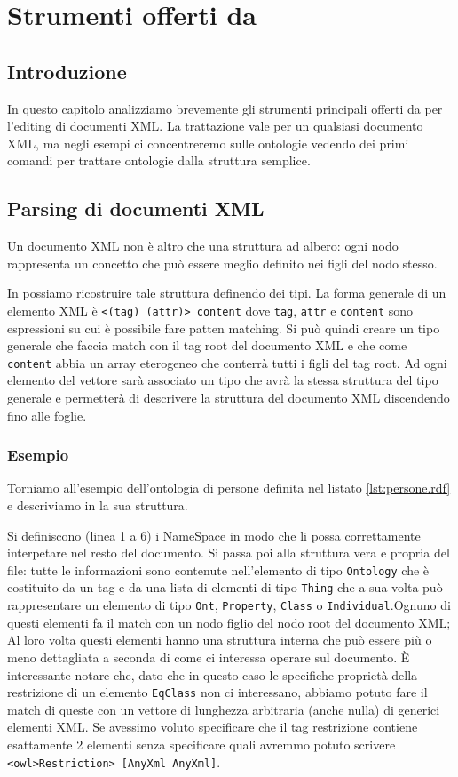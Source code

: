 \chapter{Strumenti offerti da \cduce}
\section*{Introduzione}
In questo capitolo analizziamo brevemente gli strumenti principali offerti da \cduce per l'editing di documenti XML. La trattazione vale per un qualsiasi documento XML, ma negli esempi ci concentreremo sulle ontologie vedendo dei primi comandi per trattare ontologie dalla struttura semplice. 


\section{Parsing di documenti XML}
Un documento XML non è altro che una struttura ad albero: ogni nodo rappresenta un concetto che può essere meglio definito nei figli del nodo stesso. 

In \cduce possiamo ricostruire tale struttura definendo dei tipi. La forma generale di un elemento XML è \verb|<(tag) (attr)> content| dove \verb|tag|, \verb|attr| e \verb|content| sono espressioni su cui è possibile fare patten matching. Si può quindi creare un tipo generale che faccia match con il tag root del documento XML e che come \verb|content| abbia un array eterogeneo che conterrà tutti i figli del tag root. Ad ogni elemento del vettore sarà associato un tipo che avrà la stessa struttura del tipo generale e permetterà di descrivere la struttura del documento XML discendendo fino alle foglie.
\subsection{Esempio}
Torniamo all'esempio dell'ontologia di persone definita nel listato \ref{lst:persone.rdf} e descriviamo in \cduce la sua struttura.

Si definiscono (linea 1 a 6) i NameSpace in modo che \cduce li possa correttamente interpetare nel resto del documento. Si passa poi alla struttura vera e propria del file: tutte le informazioni sono contenute nell'elemento di tipo \verb|Ontology| che è costituito da un tag e da una lista di elementi di tipo \verb|Thing| che a sua volta può rappresentare un elemento di tipo \verb|Ont|, \verb|Property|, \verb|Class| o \verb|Individual|.Ognuno di questi elementi fa il match con un nodo figlio del nodo root del documento XML; Al loro volta questi elementi hanno una struttura interna che può essere più o meno dettagliata a seconda di come ci interessa operare sul documento. È interessante notare che, dato che in questo caso le specifiche proprietà della restrizione di un elemento \verb|EqClass| non ci interessano, abbiamo potuto fare il match di queste con un vettore di lunghezza arbitraria (anche nulla) di generici elementi XML. Se avessimo voluto specificare che il tag restrizione contiene esattamente 2 elementi senza specificare quali avremmo potuto scrivere \verb|<owl>Restriction> [AnyXml AnyXml]|.


